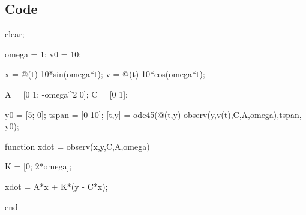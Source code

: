 \clearpage
\subsection*{Code}

\begin{matlabcode}
    clear; 
    
    omega = 1;
    v0 = 10;
    
    x = @(t) 10*sin(omega*t);
    v = @(t) 10*cos(omega*t);
    
    A = [0 1; -omega^2 0];
    C = [0 1];
    
    y0 = [5; 0];
    tspan = [0 10];
    [t,y] = ode45(@(t,y) observ(y,v(t),C,A,omega),tspan, y0);
    
\end{matlabcode}

    
\begin{matlabcode}
    function xdot = observ(x,y,C,A,omega)
    
    K = [0; 2*omega];
    
    xdot = A*x + K*(y - C*x);
    
    end
\end{matlabcode}